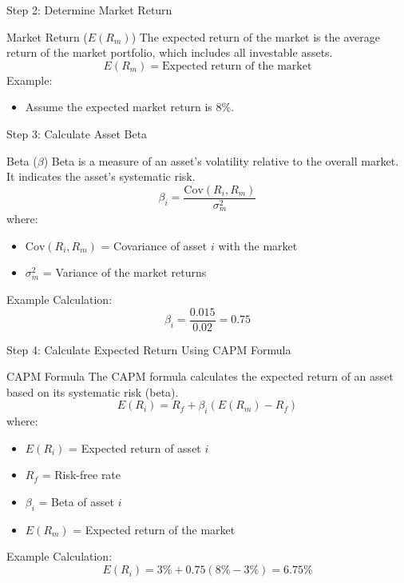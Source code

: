 \documentclass{beamer}
\begin{document}
\begin{frame}{Step 2: Determine Market Return}
  \begin{block}{Market Return (\(E(R_m)\))}
    The expected return of the market is the average return of the market portfolio, which includes all investable assets.
    \begin{equation*}
      E(R_m) = \text{Expected return of the market}
    \end{equation*}
    Example:
    \begin{itemize}
      \item Assume the expected market return is 8\%.
    \end{itemize}
  \end{block}
\end{frame}

\begin{frame}{Step 3: Calculate Asset Beta}
  \begin{block}{Beta (\(\beta\))}
    Beta is a measure of an asset's volatility relative to the overall market. It indicates the asset's systematic risk.
    \begin{equation*}
      \beta_i = \frac{\text{Cov}(R_i, R_m)}{\sigma_m^2}
    \end{equation*}
    where:
    \begin{itemize}
      \item \( \text{Cov}(R_i, R_m) \) = Covariance of asset \( i \) with the market
      \item \( \sigma_m^2 \) = Variance of the market returns
    \end{itemize}
    Example Calculation:
    \begin{equation*}
      \beta_i = \frac{0.015}{0.02} = 0.75
    \end{equation*}
  \end{block}
\end{frame}

\begin{frame}{Step 4: Calculate Expected Return Using CAPM Formula}
  \begin{block}{CAPM Formula}
    The CAPM formula calculates the expected return of an asset based on its systematic risk (beta).
    \begin{equation*}
      E(R_i) = R_f + \beta_i (E(R_m) - R_f)
    \end{equation*}
    where:
    \begin{itemize}
      \item \( E(R_i) \) = Expected return of asset \( i \)
      \item \( R_f \) = Risk-free rate
      \item \( \beta_i \) = Beta of asset \( i \)
      \item \( E(R_m) \) = Expected return of the market
    \end{itemize}
    Example Calculation:
    \begin{equation*}
      E(R_i) = 3\% + 0.75 (8\% - 3\%) = 6.75\%
    \end{equation*}
  \end{block}
\end{frame}
\end{document}
